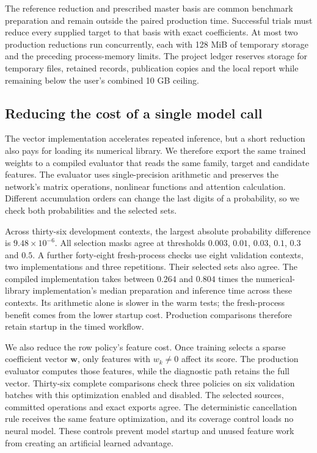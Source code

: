 The reference reduction and prescribed master basis are common benchmark
preparation and remain outside the paired production time. Successful trials
must reduce every supplied target to that basis with exact coefficients.
At most two production reductions run concurrently, each with 128 MiB of
temporary storage and the preceding process-memory limits. The project ledger
reserves storage for temporary files, retained records, publication copies and
the local report while remaining below the user's combined 10 GB ceiling.

\subsection{Reducing the cost of a single model call}
The vector implementation accelerates repeated inference, but a short
reduction also pays for loading its numerical library. We therefore export
the same trained weights to a compiled evaluator that reads the same family,
target and candidate features. The evaluator uses single-precision arithmetic
and preserves the network's matrix operations, nonlinear functions and
attention calculation. Different accumulation orders can change the last
digits of a probability, so we check both probabilities and the selected sets.

Across thirty-six development contexts, the largest absolute probability
difference is $9.48\times10^{-6}$. All selection masks agree at thresholds
$0.003$, $0.01$, $0.03$, $0.1$, $0.3$ and $0.5$. A further forty-eight fresh-process
checks use eight validation contexts, two implementations and three repetitions.
Their selected sets also agree. The compiled implementation takes between
$0.264$ and $0.804$ times the numerical-library implementation's median
preparation and inference time across these contexts. Its arithmetic alone
is slower in the warm tests; the fresh-process benefit comes from the lower
startup cost. Production comparisons therefore retain startup in the timed
workflow.

We also reduce the row policy's feature cost. Once training selects a sparse
coefficient vector $\boldsymbol w$, only features with $w_k\ne0$ affect its score.
The production evaluator computes those features, while the diagnostic path
retains the full vector. Thirty-six complete comparisons check three policies
on six validation batches with this optimization enabled and disabled.
The selected sources, committed operations and exact exports agree. The
deterministic cancellation rule receives the same feature optimization, and
its coverage control loads no neural model. These controls prevent model
startup and unused feature work from creating an artificial learned advantage.

